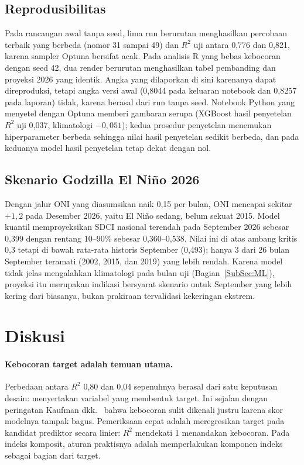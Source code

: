 \documentclass[11pt,twoside]{article}
\begin{document}
\subsection{Reprodusibilitas}
\label{SubSec:Repro}

Pada rancangan awal tanpa seed, lima run berurutan menghasilkan percobaan terbaik yang berbeda (nomor 31 sampai 49) dan $R^2$ uji antara 0,776 dan 0,821, karena sampler Optuna bersifat acak. Pada analisis R yang bebas kebocoran dengan seed 42, dua render berurutan menghasilkan tabel pembanding dan proyeksi 2026 yang identik. Angka yang dilaporkan di sini karenanya dapat direproduksi, tetapi angka versi awal (0,8044 pada keluaran notebook dan 0,8257 pada laporan) tidak, karena berasal dari run tanpa seed. Notebook Python yang menyetel dengan Optuna memberi gambaran serupa (XGBoost hasil penyetelan $R^2$ uji 0,037, klimatologi $-0{,}051$); kedua prosedur penyetelan menemukan hiperparameter berbeda sehingga nilai hasil penyetelan sedikit berbeda, dan pada keduanya model hasil penyetelan tetap dekat dengan nol.

\subsection{Skenario Godzilla El Ni\~no 2026}
\label{SubSec:Scenario}

Dengan jalur ONI yang diasumsikan naik 0,15 per bulan, ONI mencapai sekitar $+1{,}2$ pada Desember 2026, yaitu El Ni\~no sedang, belum sekuat 2015. Model kuantil memproyeksikan SDCI nasional terendah pada September 2026 sebesar 0,399 dengan rentang 10--90\% sebesar 0,360--0,538. Nilai ini di atas ambang kritis 0,3 tetapi di bawah rata-rata historis September (0,493); hanya 3 dari 26 bulan September teramati (2002, 2015, dan 2019) yang lebih rendah. Karena model tidak jelas mengalahkan klimatologi pada bulan uji (Bagian~\ref{SubSec:ML}), proyeksi itu merupakan indikasi bersyarat skenario untuk September yang lebih kering dari biasanya, bukan prakiraan tervalidasi kekeringan ekstrem.

\section{Diskusi}
\label{Sec:Discussion}

\paragraph{Kebocoran target adalah temuan utama.} Perbedaan antara $R^2$ 0,80 dan 0,04 sepenuhnya berasal dari satu keputusan desain: menyertakan variabel yang membentuk target. Ini sejalan dengan peringatan Kaufman dkk.\ \cite{kaufman2012leakage} bahwa kebocoran sulit dikenali justru karena skor modelnya tampak bagus. Pemeriksaan cepat adalah meregresikan target pada kandidat prediktor secara linier: $R^2$ mendekati 1 menandakan kebocoran. Pada indeks komposit, aturan praktisnya adalah memperlakukan komponen indeks sebagai bagian dari target.
\end{document}
